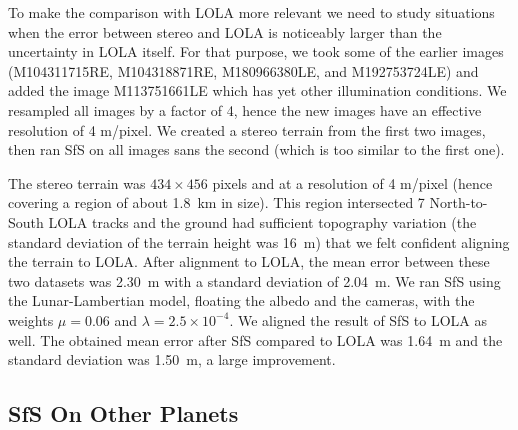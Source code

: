 \documentclass[12pt,oneside]{article}
\begin{document}
To make the comparison with LOLA more relevant we need to study situations when the error
between stereo and LOLA is noticeably larger than the uncertainty in LOLA itself. For that purpose,
we took some of the earlier images (M104311715RE, M104318871RE, M180966380LE, and M192753724LE)
and added the image M113751661LE which has yet other illumination conditions. We resampled all images
by a factor of 4, hence the new images have an effective resolution of 4 m/pixel. We created
a stereo terrain from the first two images, then ran SfS on all images sans the second (which is
too similar to the first one). 

The stereo terrain was $434\times 456$ pixels and at a resolution of 4
m/pixel (hence covering a region of about 1.8~km in size). This
region intersected 7 North-to-South LOLA tracks and the ground had
sufficient topography variation (the standard deviation of the terrain
height was 16~m) that we felt confident aligning the terrain to
LOLA. After alignment to LOLA, the mean error between these two datasets
was 2.30~m with a standard deviation of 2.04~m. We ran SfS using the
Lunar-Lambertian model, floating the albedo and the cameras, with the
weights $\mu=0.06$ and $\lambda=2.5\times 10^{-4}.$ We aligned the
result of SfS to LOLA as well. The obtained mean error after SfS
compared to LOLA was 1.64~m and the standard deviation was 1.50~m, a
large improvement.

\subsection{SfS On Other Planets}
\label{mars}
\end{document}
